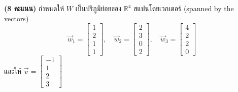 ﻿\documentclass[12pt, a4paper]{exam}
\begin{document}
\begin{questions}
\question \textbf{(8 คะแนน)} กำหนดให้ $W$ เป็นปริภูมิย่อยของ $\mathbb{R}^4$ สแปนโดย\mbox{เวกเตอร์} (spanned by the vectors)
\[
\vec{w}_1 = \begin{bmatrix} 1 \\ 2 \\ 1 \\ 1 \end{bmatrix}, \quad
\vec{w}_2 = \begin{bmatrix} 2 \\ 3 \\ 0 \\ 2 \end{bmatrix}, \quad
\vec{w}_3 = \begin{bmatrix} 4 \\ 2 \\ 2 \\ 0 \end{bmatrix}
\]
และให้ $\vec{v} = \begin{bmatrix} -1 \\ 1 \\ 2 \\ 3 \end{bmatrix}$

\end{questions}
\end{document}
